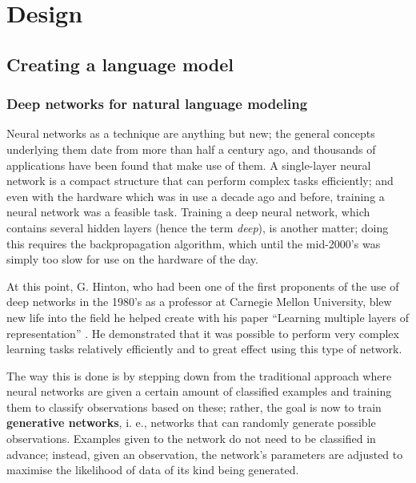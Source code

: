 \chapter{Design}
\label{chp:design} %

\section{Creating a language model}
\label{sec:training-nn}

\subsection{Deep networks for natural language modeling}
\label{sec:deepnetworks}

Neural networks as a technique are anything but new; the general
concepts underlying them date from more than half a century ago, and
thousands of applications have been found that make use of them. A
single-layer neural network is a compact structure that can perform
complex tasks efficiently; and even with the hardware which was in use
a decade ago and before, training a neural network was a feasible
task. Training a deep neural network, which contains several hidden
layers (hence the term \textit{deep}), is another matter; doing this
requires the backpropagation algorithm, which until the mid-2000's was
simply too slow for use on the hardware of the day.

At this point, G. Hinton, who had been one of the first proponents of
the use of deep networks in the 1980's as a professor at Carnegie
Mellon University, blew new life into the field he helped create with
his paper ``Learning multiple layers of representation''
\citep{hinton2007learning}. He demonstrated that it was possible to
perform very complex learning tasks relatively efficiently and to
great effect using this type of network.

The way this is done is by stepping down from the traditional approach
where neural networks are given a certain amount of classified
examples and training them to classify observations based on these;
rather, the goal is now to train \textbf{generative networks}, i. e.,
networks that can randomly generate possible observations. Examples
given to the network do not need to be classified in advance; instead,
given an observation, the network's parameters are adjusted to
maximise the likelihood of data of its kind being generated.

